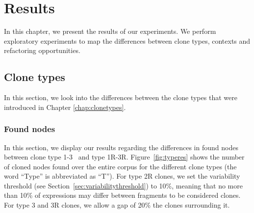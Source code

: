 \chapter{Results}\label{ch:results}
In this chapter, we present the results of our experiments. We perform exploratory experiments to map the differences between clone types, contexts and refactoring opportunities.

\section{Clone types}\label{sec:clonetypeexperiments}
In this section, we look into the differences between the clone types that were introduced in Chapter \ref{chap:clonetypes}.

\subsection{Found nodes}
In this section, we display our results regarding the differences in found nodes between clone type %
1-3~\cite{roy2007survey} and type 1R-3R. Figure~\ref{fig:typeres} shows the number of cloned nodes found over the entire corpus for the different clone types (the word ``Type'' is abbreviated as ``T''). For type 2R clones, we set the variability threshold (see Section~\ref{sec:variabilitythreshold}) to 10\%, meaning that no more than 10\% of expressions may differ between fragments to be considered clones. For type 3 and 3R clones, we allow a gap of 20\% the clones surrounding it.

